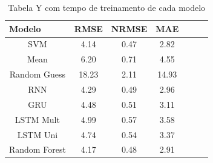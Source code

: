 \begin{table}[htbp]
    \caption{Tabela Y com tempo de treinamento de cada modelo}
    \label{table:comp_training}
    \begin{center}
    \begin{tabular}{ccccccc}
    \hline
    \multicolumn{1}{l}{\textbf{Modelo}} & \multicolumn{1}{l}{\textbf{RMSE}} & \multicolumn{1}{l}{\textbf{NRMSE}} & \multicolumn{1}{l}{\textbf{MAE}} \\
    \hline
    SVM & 4.14 & 0.47 & 2.82  \\
    Mean & 6.20 & 0.71 & 4.55 \\
    Random Guess & 18.23 & 2.11 & 14.93\\
    RNN & 4.29 & 0.49 & 2.96 \\ 
    GRU & 4.48 & 0.51 & 3.11  \\ 
    LSTM Mult & 4.99 &  0.57 & 3.58  \\ 
    LSTM Uni & 4.74 &  0.54 & 3.37  \\ 
    Random Forest & 4.17 & 0.48 & 2.91 \\
    \hline
    \end{tabular}
    \end{center}
\end{table}